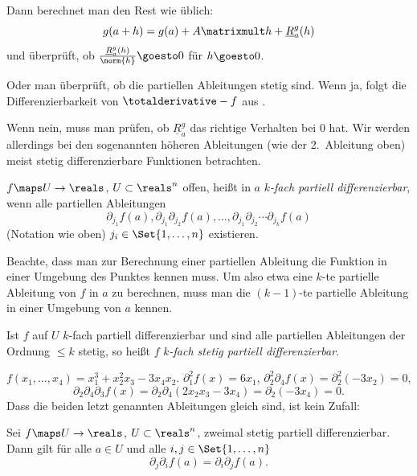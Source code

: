 Dann berechnet man den Rest wie üblich:
\begin{equation*}
  g(a+h)=g(a)+A\matrixmult h+ \underline{R}_a^g(h)
\end{equation*}
und überprüft, ob \( \frac{\underline{R}_a^g(h)}{\norm{h}}\goesto 0 \) für \( h\goesto 0 \).

Oder man überprüft, ob die partiellen Ableitungen stetig sind. Wenn ja, folgt die Differenzierbarkeit von \( \totalderivative-{f} \) aus .

Wenn nein, muss man prüfen, ob \( \underline{R}_a^g \) das richtige Verhalten bei \( 0 \) hat. Wir werden allerdings bei den sogenannten höheren Ableitungen (wie der 2.\ Ableitung oben) meist stetig differenzierbare Funktionen betrachten.

\begin{definition}
  \( f\maps U\to \reals \), \( U\subset \reals^n \) offen, heißt in \( a \) \emph{\( k \)-fach partiell differenzierbar}, wenn alle partiellen Ableitungen
  \begin{equation*}
    \partial_{j_1} f(a), \partial_{j_1} \partial_{j_2} f(a),\dotsc, \partial_{j_1}\partial_{j_2}\dotsb\partial_{j_k} f(a)
  \end{equation*}
  (Notation wie oben) \( j_i\in \Set{1,\dotsc,n} \) existieren.
  \begin{achtung*}
    Beachte, dass man zur Berechnung einer partiellen Ableitung die Funktion in einer Umgebung des Punktes kennen muss. Um also etwa eine \( k \)-te partielle Ableitung von \( f \) in \( a \) zu berechnen, muss man die \( (k-1) \)-te partielle Ableitung in einer Umgebung von \( a \) kennen.
  \end{achtung*}
  Ist \( f \) auf \( U \) \( k \)-fach partiell differenzierbar und sind alle partiellen Ableitungen der Ordnung \( \leq k \) stetig, so heißt \( f \) \emph{\( k \)-fach stetig partiell differenzierbar}.
\end{definition}
\begin{beispiel*}
  \( f(x_1,\dotsc,x_4)=x_1^3+x_2^2x_3-3x_4x_2 \). \( \partial_1^2 f(x)=6x_1 \), \( \partial_2^2 \partial_4 f(x)=\partial_2^2(-3x_2)=0 \),
  \begin{equation*}
    \partial_2 \partial_4 \partial_3 f(x)=\partial_2 \partial_4 (2x_2 x_3-3x_4)=\partial_2 (-3x_4)=0.
  \end{equation*}
  Dass die beiden letzt genannten Ableitungen gleich sind, ist kein Zufall:
\end{beispiel*}
\begin{satz}
  Sei \( f\maps U\to \reals \), \( U\subset \reals^n \), zweimal stetig partiell differenzierbar. Dann gilt für alle \( a\in U \) und alle \( i,j\in \Set{1,\dotsc,n} \)
  \begin{equation*}
    \partial_j \partial_i f(a)=\partial_i \partial_j f(a).
  \end{equation*}
\end{satz}
